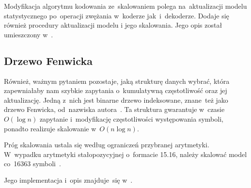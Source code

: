 \documentclass[../../thesis.tex]{subfiles}
\begin{document}
Modyfikacja algorytmu kodowania ze~skalowaniem polega na~aktualizacji
modelu statystycznego po~operacji zwężania w~koderze jak~i~dekoderze.
Dodaje się również procedury aktualizacji modelu i jego skalowania.
Jego opis został umieszczony w~\cite{Sayood:IDC}.

\subsection{Drzewo Fenwicka}

Również, ważnym pytaniem pozostaje, jaką strukturę danych wybrać, która
zapewniałaby nam szybkie zapytania o~kumulatywną częstotliwość oraz
jej aktualizację. Jedną z~nich jest binarne drzewo indeksowane, 
znane~też jako drzewo Fenwicka, od~nazwiska autora~\cite{Fenwick:FT}.
Ta struktura gwarantuje w~czasie~\( O (\log n) \) zapytanie i~modyfikację
częstotliwości występowania symboli, ponadto realizuje skalowanie w~\( O (n \log n) \).

Próg skalowania ustala się według ograniczeń przybranej arytmetyki. 
W~wypadku arytmetyki stałopozycyjnej o~formacie 15.16, należy skalować
model co~16363 symboli~\cite{Fenwick:FT}.

Jego implementacja i~opis znajduje~się w~\cite{Fenwick:FT}.
\end{document}
